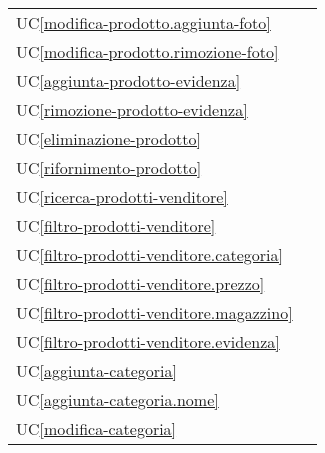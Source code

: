 \begin{longtable}{C{6cm} C{6cm}}
    UC\ref{modifica-prodotto.aggiunta-foto} &  \\

	UC\ref{modifica-prodotto.rimozione-foto} &  \\

    UC\ref{aggiunta-prodotto-evidenza} &  \\

	UC\ref{rimozione-prodotto-evidenza} &  \\

    UC\ref{eliminazione-prodotto} &  \\

    UC\ref{rifornimento-prodotto} &  \\

    UC\ref{ricerca-prodotti-venditore} &  \\

	UC\ref{filtro-prodotti-venditore} &  \\

    UC\ref{filtro-prodotti-venditore.categoria} &  \\

	UC\ref{filtro-prodotti-venditore.prezzo} &  \\

    UC\ref{filtro-prodotti-venditore.magazzino} &  \\

	UC\ref{filtro-prodotti-venditore.evidenza} &  \\

    UC\ref{aggiunta-categoria} &  \\

	UC\ref{aggiunta-categoria.nome} &  \\

    UC\ref{modifica-categoria} &  \\


\end{longtable}
